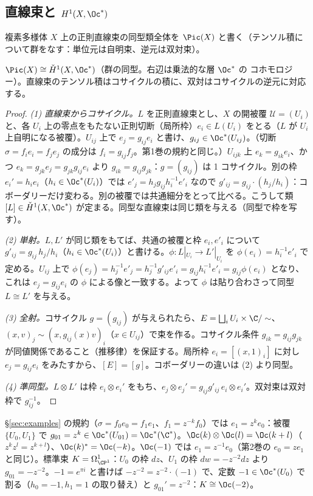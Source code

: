 \subsection{直線束と $H^1(X,\Oc^*)$}
複素多様体 $X$ 上の正則直線束の同型類全体を $\Pic(X)$ と書く（テンソル積について群をなす：単位元は自明束、逆元は双対束）。
\begin{thm}\label{thm:picH1}\tP
$\Pic(X)\cong\check H^1(X,\Oc^*)$（群の同型。右辺は乗法的な層 $\Oc^*$ の \Cech{} コホモロジー）。直線束のテンソル積はコサイクルの積に、双対はコサイクルの逆元に対応する。
\end{thm}
\begin{proof}
\emph{(1) 直線束からコサイクル。}$L$ を正則直線束とし、$X$ の開被覆 $\mathcal U=(U_i)$ と、各 $U_i$ 上の零点をもたない正則切断（局所枠）$e_i\in L(U_i)$ をとる（$L$ が $U_i$ 上自明になる被覆）。$U_{ij}$ 上で $e_j=g_{ij}e_i$ と書け、$g_{ij}\in\Oc^*(U_{ij})$。（切断 $\sigma=f_ie_i=f_je_j$ の成分は $f_i=g_{ij}f_j$。第1巻の規約と同じ。）$U_{ijk}$ 上 $e_k=g_{ik}e_i$、かつ $e_k=g_{jk}e_j=g_{jk}g_{ij}e_i$ より $g_{ik}=g_{ij}g_{jk}$：$g=(g_{ij})$ は 1 コサイクル。別の枠 $e_i'=h_ie_i$（$h_i\in\Oc^*(U_i)$）では $e'_j=h_jg_{ij}h_i^{-1}e'_i$ なので $g'_{ij}=g_{ij}\cdot(h_j/h_i)$：コボーダリーだけ変わる。別の被覆では共通細分をとって比べる。こうして類 $[L]\in\check H^1(X,\Oc^*)$ が定まる。同型な直線束は同じ類を与える（同型で枠を写す）。

\emph{(2) 単射。}$L,L'$ が同じ類をもてば、共通の被覆と枠 $e_i,e'_i$ について $g'_{ij}=g_{ij}\,h_j/h_i$（$h_i\in\Oc^*(U_i)$）と書ける。$\phi:L|_{U_i}\to L'|_{U_i}$ を $\phi(e_i)=h_i^{-1}e'_i$ で定める。$U_{ij}$ 上で $\phi(e_j)=h_j^{-1}e'_j=h_j^{-1}g'_{ij}e'_i=g_{ij}h_i^{-1}e'_i=g_{ij}\phi(e_i)$ となり、これは $e_j=g_{ij}e_i$ の $\phi$ による像と一致する。よって $\phi$ は貼り合わさって同型 $L\cong L'$ を与える。

\emph{(3) 全射。}コサイクル $g=(g_{ij})$ が与えられたら、$E=\bigsqcup_iU_i\times\C/\sim$、$(x,v)_j\sim(x,g_{ij}(x)v)_i$（$x\in U_{ij}$）で束を作る。コサイクル条件 $g_{ik}=g_{ij}g_{jk}$ が同値関係であること（推移律）を保証する。局所枠 $e_i=[(x,1)_i]$ に対し $e_j=g_{ij}e_i$ をみたすから、$[E]=[g]$。コボーダリーの違いは (2) より同型。

\emph{(4) 準同型。}$L\otimes L'$ は枠 $e_i\otimes e_i'$ をもち、$e_j\otimes e_j'=g_{ij}g'_{ij}\,e_i\otimes e_i'$。双対束は双対枠で $g_{ij}^{-1}$。\qedhere
\end{proof}
\begin{ex}[$\Oc(k)\to\CP^1$ のコサイクル]\label{ex:Okcocycle}
\S\ref{sec:examples} の規約（$\sigma=f_0e_0=f_1e_1$、$f_1=z^{-k}f_0$）では $e_1=z^ke_0$：被覆 $\{U_0,U_1\}$ で $g_{01}=z^k\in\Oc^*(U_{01})=\Oc^*(\C^*)$。$\Oc(k)\otimes\Oc(l)=\Oc(k+l)$（$z^kz^l=z^{k+l}$）、$\Oc(k)^*=\Oc(-k)$。$\Oc(-1)$ では $e_1=z^{-1}e_0$（第2巻の $e_0=ze_1$ と同じ）。標準束 $K=\Omega^1_{\CP^1}$：$U_0$ の枠 $dz$、$U_1$ の枠 $dw=-z^{-2}dz$ より $g_{01}=-z^{-2}$。$-1=e^{\pi i}$ と書けば $-z^{-2}=z^{-2}\cdot(-1)$ で、定数 $-1\in\Oc^*(U_0)$ で割る（$h_0=-1,h_1=1$ の取り替え）と $g_{01}'=z^{-2}$：$K\cong\Oc(-2)$。
\end{ex}
